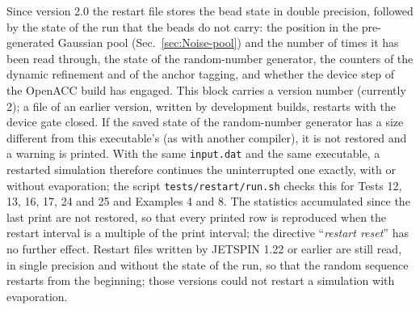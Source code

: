 Since version 2.0 the restart file stores the bead state in double
precision, followed by the state of the run that the beads do not carry: the
position in the pre-generated Gaussian pool (Sec.~\ref{sec:Noise-pool}) and
the number of times it has been read through, the state of the
random-number generator, the counters of the dynamic refinement and of the
anchor tagging, and whether the device step of the OpenACC build has engaged.
This block carries a version number (currently 2); a file of an earlier
version, written by development builds, restarts with the device gate
closed. If the saved state of the random-number generator has a size
different from this executable's (as with another compiler), it is not
restored and a warning is printed.
With the same \texttt{input.dat} and the same executable, a restarted
simulation therefore continues the uninterrupted one exactly, with or without
evaporation; the script \texttt{tests/restart/run.sh} checks this for Tests
12, 13, 16, 17, 24 and 25 and Examples 4 and 8. The statistics accumulated since the last print are not
restored, so that every printed row is reproduced when the restart interval
is a multiple of the print interval; the directive ``\textit{restart reset}''
has no further effect. Restart files written by JETSPIN 1.22 or earlier
are still read, in single precision and without the state of the run, so
that the random sequence restarts from the beginning; those versions could
not restart a simulation with evaporation.
